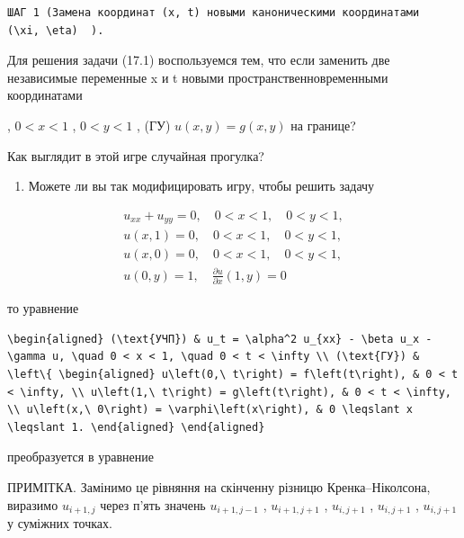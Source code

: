 \documentclass[
  ukrainian,
]{article}
\providecommand{\tightlist}{%
  \setlength{\itemsep}{0pt}\setlength{\parskip}{0pt}}
\begin{document}
\begin{verbatim}
ШАГ 1 (Замена координат (x, t) новыми каноническими координатами   (\xi, \eta)  ).
\end{verbatim}

Для решения задачи (17.1) воспользуемся тем, что если заменить две
независимые переменные x и t новыми пространственновременными
координатами

, \(0 < x < 1\) , \(0 < y < 1\) , (ГУ) \(u(x, y) = g(x, y)\) на границе?

Как выглядит в этой игре случайная прогулка?

\begin{enumerate}
\def\labelenumi{\arabic{enumi}.}
\setcounter{enumi}{3}
\tightlist
\item
  Можете ли вы так модифицировать игру, чтобы решить задачу
\end{enumerate}

\[
\begin{aligned} u_{xx} + u_{yy} = 0, \quad 0 < x < 1, \quad 0 < y < 1, \\ u(x, 1) = 0, \quad 0 < x < 1, \quad 0 < y < 1, \\ u(x, 0) = 0, \quad 0 < x < 1, \quad 0 < y < 1, \\ u(0, y) = 1, \quad \frac{\partial u}{\partial x}(1, y) = 0 \end{aligned}
\]

то уравнение

\begin{verbatim}
\begin{aligned} (\text{УЧП}) & u_t = \alpha^2 u_{xx} - \beta u_x - \gamma u, \quad 0 < x < 1, \quad 0 < t < \infty \\ (\text{ГУ}) & \left\{ \begin{aligned} u\left(0,\ t\right) = f\left(t\right), & 0 < t < \infty, \\ u\left(1,\ t\right) = g\left(t\right), & 0 < t < \infty, \\ u\left(x,\ 0\right) = \varphi\left(x\right), & 0 \leqslant x \leqslant 1. \end{aligned} \end{aligned}
\end{verbatim}

преобразуется в уравнение

ПРИМІТКА. Замінимо це рівняння на скінченну різницю Кренка--Ніколсона,
виразимо \(u_{i+1,j}\) через п'ять значень \(u_{i+1,j-1}\) ,
\(u_{i+1,j+1}\) , \(u_{i,j+1}\) , \(u_{i,j+1}\) , \(u_{i,j+1}\) у
суміжних точках.
\end{document}
